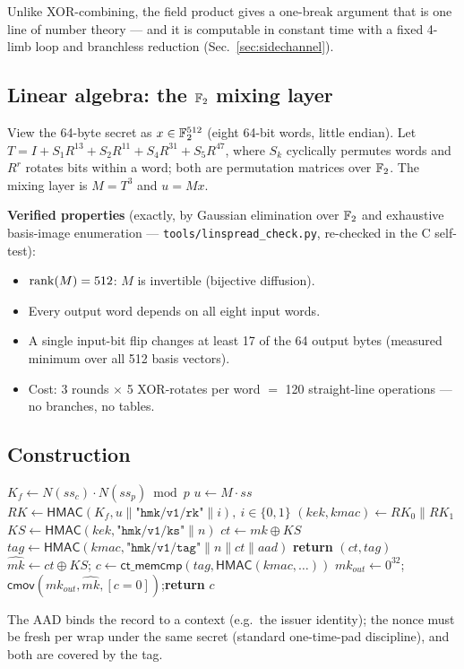 \begin{remark}
Unlike XOR-combining, the field product gives a one-break argument that is
one line of number theory --- and it is computable in constant time with a
fixed 4-limb loop and branchless reduction (Sec.~\ref{sec:sidechannel}).
\end{remark}

\subsection{Linear algebra: the $\mathbb{F}_2$ mixing layer}
\begin{definition}
\label{def:matrix}
View the 64-byte secret as $x \in \mathbb{F}_2^{512}$ (eight 64-bit words, little
endian). Let
$T = I + S_1R^{13} + S_2R^{11} + S_4R^{31} + S_5R^{47}$, where $S_k$ cyclically
permutes words and $R^r$ rotates bits within a word; both are permutation
matrices over $\mathbb{F}_2$. The mixing layer is $M = T^3$ and $u = Mx$.
\end{definition}

\noindent\textbf{Verified properties} (exactly, by Gaussian elimination over
$\mathbb{F}_2$ and exhaustive basis-image enumeration --- \texttt{tools/linspread\_check.py},
re-checked in the C self-test):
\begin{itemize}
  \item $\mathrm{rank}(M) = 512$: $M$ is invertible (bijective diffusion).
  \item Every output word depends on all eight input words.
  \item A single input-bit flip changes at least 17 of the 64 output bytes
        (measured minimum over all 512 basis vectors).
  \item Cost: 3 rounds $\times$ 5 XOR-rotates per word $=$ 120 straight-line
        operations --- no branches, no tables.
\end{itemize}

\subsection{Construction}
\begin{algorithm}[t]
\caption{HMK-1: \texttt{wrap} / \texttt{unwrap} (fixed lengths:
$ss{=}64$, $mk{=}32$, $n{=}16$, $tag{=}32$ bytes)}
\label{alg:wrap}
\begin{algorithmic}[1]
\STATE $K_f \gets N(ss_c)\cdot N(ss_p) \bmod p$ 
\STATE $u \gets M\cdot ss$ 
\STATE $RK \gets \mathsf{HMAC}(K_f, u \| \texttt{"hmk/v1/rk"} \| i),\ i \in \{0,1\}$
\STATE $(kek, kmac) \gets RK_0 \| RK_1$
\STATE $KS \gets \mathsf{HMAC}(kek, \texttt{"hmk/v1/ks"} \| n)$ 
\STATE $ct \gets mk \oplus KS$
\STATE $tag \gets \mathsf{HMAC}(kmac, \texttt{"hmk/v1/tag"} \| n \| ct \| aad)$
\STATE \textbf{return} $(ct, tag)$
\STATESK $\hat{mk} \gets ct \oplus KS$;\quad
        $c \gets \mathsf{ct\_memcmp}(tag, \mathsf{HMAC}(kmac, \ldots))$
\STATESK $mk_{out} \gets 0^{32}$;\quad
        $\mathsf{cmov}(mk_{out}, \hat{mk}, [c = 0])$;\quad \textbf{return} $c$
\end{algorithmic}
\end{algorithm}

\noindent The AAD binds the record to a context (e.g.\ the issuer identity);
the nonce must be fresh per wrap under the same secret (standard one-time-pad
discipline), and both are covered by the tag.


